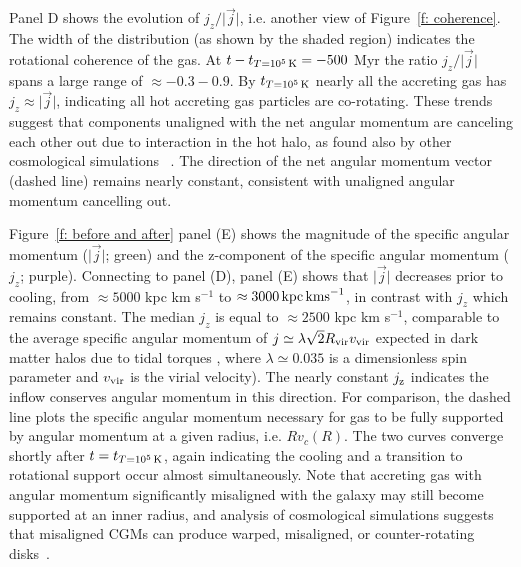 \documentclass[fleqn,usenatbib]{mnras}
\newcommand{\tcon}{t_{T=10^5\,{\rm K}}}
\newcommand{\Rvir}{R_{\rm vir}}
\newcommand{\vvir}{v_{\rm vir}}
\begin{document}


Panel D shows the evolution of $j_z/\vert\vec j\vert$, i.e. another view of Figure~\ref{f: coherence}.
The width of the distribution (as shown by the shaded region) indicates the rotational coherence of the gas.
At $t-\tcon=-500$ Myr the ratio $j_z/\vert\vec j\vert$ spans a large range of $\approx -0.3 - 0.9$.
By $\tcon$ nearly all the accreting gas has $j_z\approx\vert\vec j\vert$, indicating all hot accreting gas particles are co-rotating. 
These trends suggest that components unaligned with the net angular momentum are canceling each other out due to interaction in the hot halo, as found also by other cosmological simulations ~\citep[e.g.][]{DeFelippis2017}.
The direction of the net angular momentum vector (dashed line) remains nearly constant, consistent with unaligned angular momentum cancelling out.

Figure~\ref{f: before and after} panel (E) shows the magnitude of the specific angular momentum ($\vert \vec j \vert$; green) and the z-component of the specific angular momentum ($j_z$; purple).
Connecting to panel (D), panel (E) shows that $\vert \vec j \vert$ decreases prior to cooling, from $\approx 5000$ kpc km s$^{-1}$ to $\approx 3000\,{\rm kpc\,km s}^{-1}$, in contrast with  $j_z$ which remains constant.
The median $j_z$ is equal to $\approx 2500$ kpc km s$^{-1}$, comparable to the average specific angular momentum of $j \simeq \lambda \sqrt{2} \Rvir \vvir$  expected in dark matter halos due to tidal torques \citep[e.g.][]{Bullock2001}, where $\lambda \simeq 0.035$ is a dimensionless spin parameter and $\vvir$ is the virial velocity).
The nearly constant $j_{\rm z}$ indicates the inflow conserves angular momentum in this direction.
For comparison, the dashed line plots the specific angular momentum necessary for gas to be fully supported by angular momentum at a given radius, i.e. $Rv_c(R)$.
The two curves converge shortly after $t=\tcon$, again indicating the cooling and a transition to rotational support occur almost simultaneously.
Note that accreting gas with angular momentum significantly misaligned with the galaxy may still become supported at an inner radius, and analysis of cosmological simulations suggests that misaligned CGMs can produce warped, misaligned, or counter-rotating disks~\citep[e.g.][]{Roskar2010, Starkenburg2019}.
\end{document}
